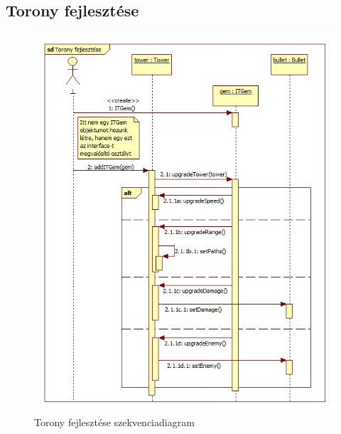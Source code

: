 \subsection{Torony fejlesztése}
\begin{figure}[H]
\begin{center}
\includegraphics[width=17cm]{chapters/chapter04/images/Torony_fejlesztese.jpg}
\caption{Torony fejlesztése szekvenciadiagram}
\label{fig:Torony_fejlesztése}
\end{center}
\end{figure}

